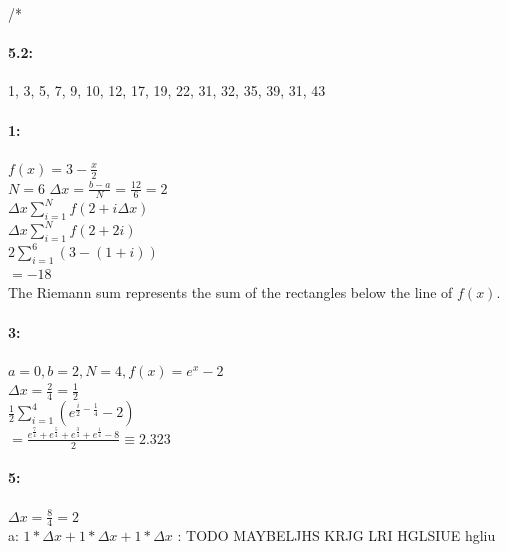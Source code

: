 \documentclass[12pt]{article}
\begin{document}
/* \paragraph*{5.2:} 1, 3, 5, 7, 9, 10, 12, 17, 19, 22, 31, 32, 35, 39, 31, 43

    \paragraph*{1:\\}
    $f(x) = 3 - \frac{x}{2}$\\
    $N = 6$
    $\Delta x = \frac{b-a}{N} = \frac{12}{6} = 2$\\
    $\Delta x \sum\limits_{i=1}^{N}f(2 + i \Delta x)$\\
    $\Delta x \sum\limits_{i=1}^{N}f(2 + 2i)$\\
    $2 \sum\limits_{i=1}^{6}(3 - (1 +i))$\\
    $= -18$\\
    The Riemann sum represents the sum of the rectangles below the line of $f(x)$. 

    \paragraph*{3:\\}
    $a = 0, b = 2, N = 4, f(x) = e^x - 2$\\
    $\Delta x = \frac{2}{4} = \frac{1}{2}$\\
    $\frac{1}{2} \sum\limits_{i=1}^{4}(e^{\frac{i}{2} - \frac{1}{4}} - 2)$\\
    $= \frac{e^\frac{7}{4} + e^\frac{5}{4} + e^\frac{3}{4} + e^\frac{1}{4} - 8}{2} \equiv 2.323$\\

    \paragraph*{5:\\}
    $\Delta x = \frac{8}{4} = 2$\\
    a: $1*\Delta x + 1*\Delta x + 1*\Delta x$ : TODO MAYBELJHS KRJG LRI HGLSIUE hgliu


\thispagestyle{fancy}
\end{document}
